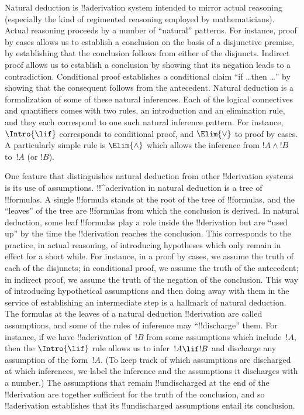 \documentclass[../../../include/open-logic-section]{subfiles}
\begin{document}
      {}
      {}


Natural deduction is !!a{derivation} system intended to mirror actual
reasoning (especially the kind of regimented reasoning employed by
mathematicians).  Actual reasoning proceeds by a number of ``natural''
patterns. For instance, proof by cases allows us to establish a
conclusion on the basis of a disjunctive premise, by establishing that
the conclusion follows from either of the disjuncts. Indirect proof
allows us to establish a conclusion by showing that its negation leads
to a contradiction. Conditional proof establishes a conditional claim
``if \dots then \dots'' by showing that the consequent follows from
the antecedent.  Natural deduction is a formalization of some of these
natural inferences.  Each of the logical connectives and quantifiers
comes with two rules, an introduction and an elimination rule, and
they each correspond to one such natural inference pattern. For
instance, $\Intro{\lif}$ corresponds to conditional proof, and
$\Elim{\lor}$ to proof by cases.  A particularly simple rule is
$\Elim{\land}$ which allows the inference from $!A \land !B$ to~$!A$
(or $!B$).

One feature that distinguishes natural deduction from other
!!{derivation} systems is its use of assumptions. !!^a{derivation} in
natural deduction is a tree of !!{formula}s.  A single !!{formula}
stands at the root of the tree of !!{formula}s, and the ``leaves'' of
the tree are !!{formula}s from which the conclusion is derived.  In
natural deduction, some leaf !!{formula}s play a role inside the
!!{derivation} but are ``used up'' by the time the !!{derivation}
reaches the conclusion. This corresponds to the practice, in actual
reasoning, of introducing hypotheses which only remain in effect for a
short while.  For instance, in a proof by cases, we assume the truth
of each of the disjuncts; in conditional proof, we assume the truth of
the antecedent; in indirect proof, we assume the truth of the negation
of the conclusion.  This way of introducing hypothetical assumptions
and then doing away with them in the service of establishing an
intermediate step is a hallmark of natural deduction. The formulas at
the leaves of a natural deduction !!{derivation} are called
assumptions, and some of the rules of inference may ``!!{discharge}''
them.  For instance, if we have !!a{derivation} of~$!B$ from some
assumptions which include~$!A$, then the $\Intro{\lif}$ rule allows us
to infer~$!A \lif !B$ and discharge any assumption of the form~$!A$.
(To keep track of which assumptions are discharged at which
inferences, we label the inference and the assumptions it discharges
with a number.)  The assumptions that remain !!{undischarged} at the
end of the !!{derivation} are together sufficient for the truth of the
conclusion, and so !!a{derivation} establishes that its
!!{undischarged} assumptions entail its conclusion.
\end{document}
